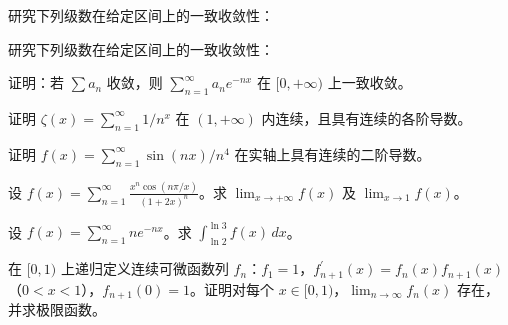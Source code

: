 \noindent\begin{minipage}{\textwidth}
研究下列级数在给定区间上的一致收敛性：
\end{minipage}\par\vfill
\noindent\begin{minipage}{\textwidth}
研究下列级数在给定区间上的一致收敛性：
\end{minipage}\par\vfill
\noindent\begin{minipage}{\textwidth}
证明：若 $\sum a_n$ 收敛，则 $\sum_{n=1}^{\infty}a_n e^{-nx}$ 在 $[0,+\infty)$ 上一致收敛。
\end{minipage}\par\vfill
\newpage
\noindent\begin{minipage}{\textwidth}
证明 $\zeta(x)=\sum_{n=1}^{\infty}1/n^x$ 在 $(1,+\infty)$ 内连续，且具有连续的各阶导数。
\end{minipage}\par\vfill
\noindent\begin{minipage}{\textwidth}
证明 $f(x)=\sum_{n=1}^{\infty}\sin(nx)/n^4$ 在实轴上具有连续的二阶导数。
\end{minipage}\par\vfill
\noindent\begin{minipage}{\textwidth}
设 $\displaystyle f(x)=\sum_{n=1}^{\infty}\frac{x^n\cos(n\pi/x)}{(1+2x)^n}$。求 $\lim_{x\to+\infty}f(x)$ 及 $\lim_{x\to1}f(x)$。
\end{minipage}\par\vfill
\noindent\begin{minipage}{\textwidth}
设 $f(x)=\sum_{n=1}^{\infty}ne^{-nx}$。求 $\int_{\ln2}^{\ln3}f(x)\,dx$。
\end{minipage}\par\vfill
\newpage
\noindent\begin{minipage}{\textwidth}
在 $[0,1)$ 上递归定义连续可微函数列 $f_n$：$f_1=1$，$f_{n+1}^{\prime}(x)=f_n(x)f_{n+1}(x)$（$0<x<1$），$f_{n+1}(0)=1$。证明对每个 $x\in[0,1)$，$\lim_{n\to\infty}f_n(x)$ 存在，并求极限函数。
\end{minipage}\par\vfill
